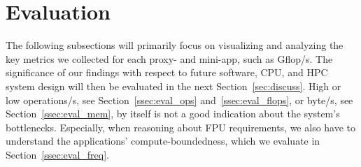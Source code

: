 \section{Evaluation}\label{sec:eval}
%
The following subsections will primarily focus on visualizing and analyzing the key metrics we collected for each proxy- and mini-app,
such as \unit[]{Gflop/s}. The significance of our findings with respect to future software, CPU, and HPC system design will then
be evaluated in the next Section~\ref{sec:discuss}.
High or low \unit[]{operations/s}, see Section~\ref{ssec:eval_ops} and~\ref{ssec:eval_flops}, or \unit[]{byte/s}, see
Section~\ref{ssec:eval_mem}, by itself is not a good indication about the system's bottlenecks.
Especially, when reasoning about FPU requirements, we also have to understand the applications' compute-boundedness, which
we evaluate in Section~\ref{ssec:eval_freq}.

%

